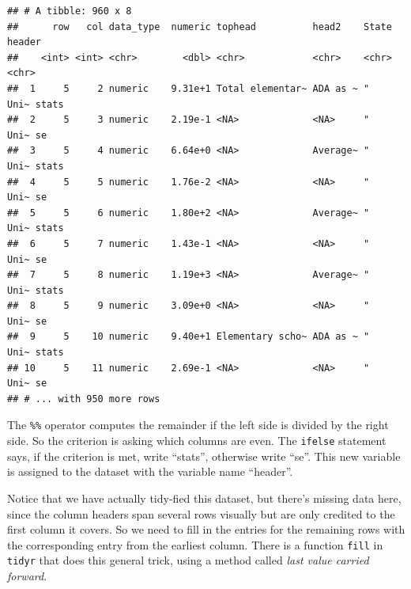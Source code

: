 \documentclass[12pt,letterpaperpaper,openany]{book}
\newenvironment{Shaded}{\begin{snugshade}}{\end{snugshade}}
\newcommand{\DataTypeTok}[1]{\textcolor[rgb]{0.13,0.29,0.53}{#1}}
\newcommand{\DecValTok}[1]{\textcolor[rgb]{0.00,0.00,0.81}{#1}}
\newcommand{\KeywordTok}[1]{\textcolor[rgb]{0.13,0.29,0.53}{\textbf{#1}}}
\newcommand{\NormalTok}[1]{#1}
\newcommand{\OperatorTok}[1]{\textcolor[rgb]{0.81,0.36,0.00}{\textbf{#1}}}
\newcommand{\StringTok}[1]{\textcolor[rgb]{0.31,0.60,0.02}{#1}}
\begin{document}
\begin{Shaded}
\end{Shaded}

\begin{verbatim}
## # A tibble: 960 x 8
##      row   col data_type  numeric tophead          head2    State    header
##    <int> <int> <chr>        <dbl> <chr>            <chr>    <chr>    <chr> 
##  1     5     2 numeric    9.31e+1 Total elementar~ ADA as ~ "   Uni~ stats 
##  2     5     3 numeric    2.19e-1 <NA>             <NA>     "   Uni~ se    
##  3     5     4 numeric    6.64e+0 <NA>             Average~ "   Uni~ stats 
##  4     5     5 numeric    1.76e-2 <NA>             <NA>     "   Uni~ se    
##  5     5     6 numeric    1.80e+2 <NA>             Average~ "   Uni~ stats 
##  6     5     7 numeric    1.43e-1 <NA>             <NA>     "   Uni~ se    
##  7     5     8 numeric    1.19e+3 <NA>             Average~ "   Uni~ stats 
##  8     5     9 numeric    3.09e+0 <NA>             <NA>     "   Uni~ se    
##  9     5    10 numeric    9.40e+1 Elementary scho~ ADA as ~ "   Uni~ stats 
## 10     5    11 numeric    2.69e-1 <NA>             <NA>     "   Uni~ se    
## # ... with 950 more rows
\end{verbatim}

The \texttt{\%\%} operator computes the remainder if the left side is divided by the right side.
So the criterion is asking which columns are even. The \texttt{ifelse} statement says,
if the criterion is met, write ``stats'', otherwise write ``se''. This new variable
is assigned to the dataset with the variable name ``header''.

Notice that we have actually tidy-fied this dataset, but there's missing data here, since
the column headers span several rows visually but are only credited to the first column it covers.
So we need to fill in the entries for the remaining rows with the corresponding entry from the earliest column.
There is a function \texttt{fill} in \texttt{tidyr} that does this general trick, using a method called \emph{last value carried forward}.
\end{document}
